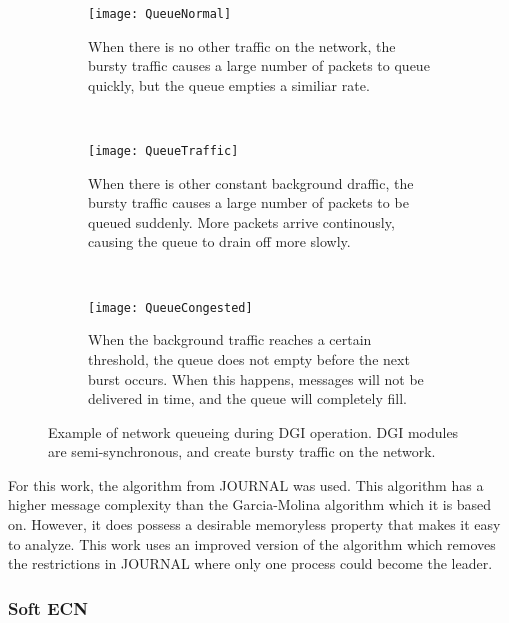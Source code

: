 \begin{figure}
    \centering
    \begin{subfigure}[t]{0.3\textwidth}
        \texttt{[image: QueueNormal]}
        \caption{When there is no other traffic on the network, the bursty traffic causes a large number of packets to queue quickly, but the queue empties a similiar rate.}
        \label{fig:queue-normal}
    \end{subfigure}
    ~ %
    \begin{subfigure}[t]{0.3\textwidth}
        \texttt{[image: QueueTraffic]}
        \caption{When there is other constant background draffic, the bursty traffic causes a large number of packets to be queued suddenly. More packets arrive continously, causing the queue to drain off more slowly.}
        \label{fig:queue-traffic}
    \end{subfigure}
    ~ %
    \begin{subfigure}[t]{0.3\textwidth}
        \texttt{[image: QueueCongested]}
        \caption{When the background traffic reaches a certain threshold, the queue does not empty before the next burst occurs. When this happens, messages will not be delivered in time, and the queue will completely fill.}
        \label{fig:queue-congested}
    \end{subfigure}
    \caption{Example of network queueing during DGI operation. DGI modules are semi-synchronous, and create bursty traffic on the network.}\label{fig:queue-types}
\end{figure}

For this work, the algorithm from JOURNAL was used.
This algorithm has a higher message complexity than the Garcia-Molina algorithm which it is based on.
However, it does possess a desirable memoryless property that makes it easy to analyze.
This work uses an improved version of the algorithm which removes the restrictions in JOURNAL where only one process could become the leader.

\subsubsection{Soft ECN}

